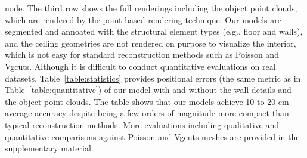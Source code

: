 node. The third row shows the full renderings including the object point
clouds, which are rendered by the point-based rendering technique. Our
models are segmented and annoated with the structural element types
(e.g., floor and walls), and the ceiling geometries are not rendered on
purpose to visualize the interior, which is not easy for standard
reconstruction methods such as Poisson and Vgcuts.
%
%
%
%
Although it is difficult to conduct quantitative evaluations on real
datasets, Table~\ref{table:statistics} provides positional errors (the
same metric as in Table~\ref{table:quantitative}) of our model with and
without the wall details and the object point clouds.
The table shows that our models achieve 10 to 20 cm average accuracy
despite being a few orders of magnitude more compact than typical
reconstruction methods.
%
More evaluations including qualitative and quantitative comparisons
against Poisson and Vgcuts meshes are provided in the supplementary material.







